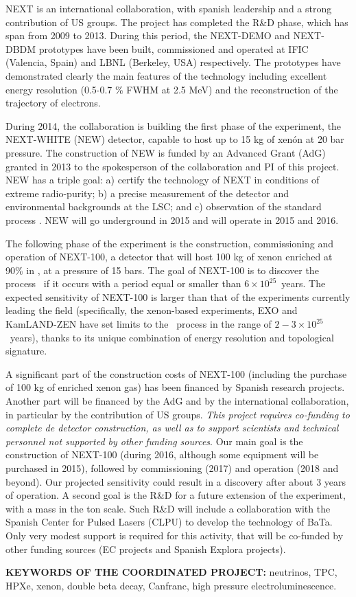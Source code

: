 \documentclass[a4paper,11pt,oneside]{article}
\begin{document}
NEXT is an international collaboration, with spanish leadership and a strong contribution of US groups. The project has completed the R\&D phase, which has span from 2009 to 2013. During this period, the NEXT-DEMO and NEXT-DBDM prototypes have been built, commissioned and operated at IFIC (Valencia, Spain) and LBNL (Berkeley, USA) respectively. The prototypes have demonstrated clearly the main features of the technology including excellent energy resolution (0.5-0.7 \% FWHM at 2.5 MeV) and the reconstruction of the trajectory of electrons.

During 2014, the collaboration is building the first phase of the experiment, the NEXT-WHITE (NEW) detector, capable to host up to 15 kg of xenón at 20 bar pressure. The construction of NEW is funded by an Advanced Grant (AdG) granted in 2013 to the spokesperson of the collaboration and PI of this project. NEW has a triple goal: a) certify the technology of NEXT in conditions of extreme radio-purity; b) a precise measurement of the detector and environmental backgrounds at the LSC; and c) observation of the standard process \bbtnu. NEW will go underground in 2015 and will operate in 2015 and 2016.  

The following phase of the experiment is the construction, commissioning and operation of NEXT-100, a detector that will host 100 kg of xenon enriched at 90\% in \XE, at a pressure of 15 bars. The goal of NEXT-100 is to discover the process \bbonu\ if it occurs with a period equal or smaller than  $6 \times 10^{25}$~years. The expected sensitivity of NEXT-100 is larger than that of the experiments currently leading the field (specifically, the xenon-based experiments, EXO and KamLAND-ZEN have set limits to the \bbonu\ process in the range of $2-3 \times 10^{25}$~years), thanks to its unique combination of energy resolution and topological signature. 

A significant part of the construction costs of NEXT-100 (including the purchase of 100 kg of enriched xenon gas) has been financed by Spanish research projects. Another part will be financed by the AdG and by the international collaboration, in particular by the contribution of US groups. {\em This project requires co-funding to complete de detector construction, as well as to support scientists and technical personnel not supported by other funding sources}. Our main goal is the construction of NEXT-100 (during 2016, although some equipment will be purchased in 2015), followed by commissioning (2017) and operation (2018 and beyond). Our projected sensitivity could result in a discovery after about 3 years of operation. A second goal is the R\&D for a future extension of the experiment, with a mass in the ton scale. Such R\&D will include a collaboration with the Spanish Center for Pulsed Lasers (CLPU) to develop the technology of  {\sc BaTa}. Only very modest support is required for this activity, that will be co-funded by other funding sources (EC projects and Spanish Explora projects). 

 \vspace{0.3cm}

{\bf KEYWORDS OF THE COORDINATED PROJECT:} neutrinos, TPC, HPXe, xenon, double beta decay, Canfranc, high pressure electroluminescence. 
\end{document}
